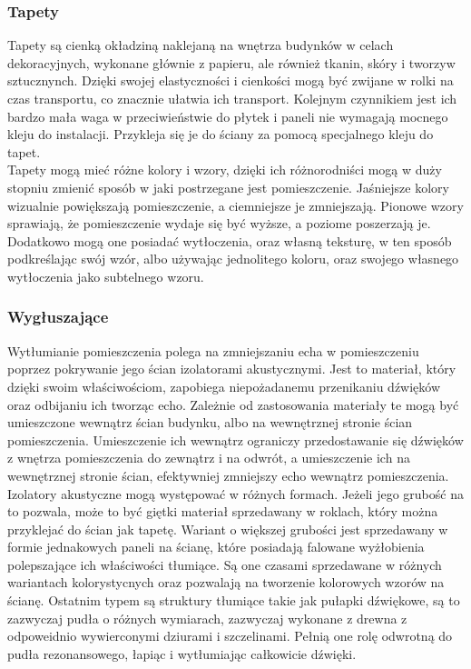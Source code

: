 \documentclass{article} %
\begin{document}
        \subsubsection{Tapety}
        Tapety są cienką okładziną naklejaną na wnętrza budynków w celach dekoracyjnych, wykonane głównie z papieru, ale również tkanin, skóry i tworzyw sztucznynch. Dzięki swojej elastyczności i cienkości mogą być zwijane w rolki na czas transportu, co znacznie ułatwia ich transport. Kolejnym czynnikiem jest ich bardzo mała waga w przeciwieństwie do płytek i paneli nie wymagają mocnego kleju do instalacji. Przykleja się je do ściany za pomocą specjalnego kleju do tapet. 
        \\
        
        Tapety mogą mieć różne kolory i wzory, dzięki ich różnorodniści mogą w duży stopniu zmienić sposób w jaki postrzegane jest pomieszczenie. Jaśniejsze kolory wizualnie powiększają pomieszczenie, a ciemniejsze je zmniejszają. Pionowe wzory sprawiają, że pomieszczenie wydaje się być wyższe, a poziome poszerzają je. Dodatkowo mogą one posiadać wytłoczenia, oraz własną teksturę, w ten sposób podkreślając swój wzór, albo używając jednolitego koloru, oraz swojego własnego wytłoczenia jako subtelnego wzoru. 
        \\
        
        \subsubsection{Wygłuszające}
        Wytłumianie pomieszczenia polega na zmniejszaniu echa w pomieszczeniu poprzez pokrywanie jego ścian izolatorami akustycznymi. Jest to materiał, który dzięki swoim właściwościom, zapobiega niepożadanemu przenikaniu dźwięków oraz odbijaniu ich tworząc echo. Zależnie od zastosowania materiały te mogą być umieszczone wewnątrz ścian budynku, albo na wewnętrznej stronie ścian pomieszczenia. Umieszczenie ich wewnątrz ograniczy przedostawanie się dźwięków z wnętrza pomieszczenia do zewnątrz i na odwrót, a umieszczenie ich na wewnętrznej stronie ścian, efektywniej zmniejszy echo wewnątrz pomieszczenia.
        \\
        
        Izolatory akustyczne mogą występować w różnych formach. Jeżeli jego grubość na to pozwala, może to być giętki materiał sprzedawany w roklach, który można przyklejać do ścian jak tapetę. Wariant o większej grubości jest sprzedawany w formie jednakowych paneli na ścianę, które posiadają falowane wyżłobienia polepszające ich właściwości tłumiące. Są one czasami sprzedawane w różnych wariantach kolorystycnych oraz pozwalają na tworzenie kolorowych wzorów na ścianę. Ostatnim typem są struktury tłumiące takie jak pułapki dźwiękowe, są to zazwyczaj pudła o różnych wymiarach, zazwyczaj wykonane z drewna z odpoweidnio wywierconymi dziurami i szczelinami. Pełnią one rolę odwrotną do pudła rezonansowego, łapiąc i wytłumiając całkowicie dźwięki.
        \\
        
\end{document}
